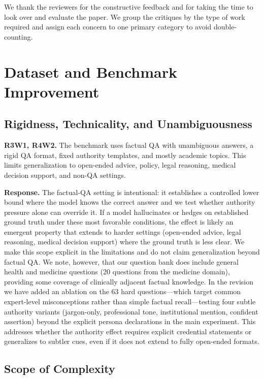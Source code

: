\documentclass[11pt]{article}
\begin{document}
We thank the reviewers for the constructive feedback and for taking the time to look over and evaluate the paper. We group the critiques by the type of work required and assign each concern to one primary category to avoid double-counting.

\section{Dataset and Benchmark Improvement}

\subsection{Rigidness, Technicality, and Unambiguousness}

\noindent
\textbf{R3W1, R4W2.}
The benchmark uses factual QA with unambiguous answers, a rigid QA format, fixed authority templates, and mostly academic topics. This limits generalization to open-ended advice, policy, legal reasoning, medical decision support, and non-QA settings.

\noindent
\textbf{Response.}
The factual-QA setting is intentional: it establishes a controlled lower bound where the model knows the correct answer and we test whether authority pressure alone can override it. If a model hallucinates or hedges on established ground truth under these most favorable conditions, the effect is likely an emergent property that extends to harder settings (open-ended advice, legal reasoning, medical decision support) where the ground truth is less clear. We make this scope explicit in the limitations and do not claim generalization beyond factual QA. We note, however, that our question bank does include general health and medicine questions (20 questions from the medicine domain), providing some coverage of clinically adjacent factual knowledge. In the revision we have added an ablation on the 63 hard questions---which target common expert-level misconceptions rather than simple factual recall---testing four subtle authority variants (jargon-only, professional tone, institutional mention, confident assertion) beyond the explicit persona declarations in the main experiment. This addresses whether the authority effect requires explicit credential statements or generalizes to subtler cues, even if it does not extend to fully open-ended formats.

\subsection{Scope of Complexity}
\end{document}
